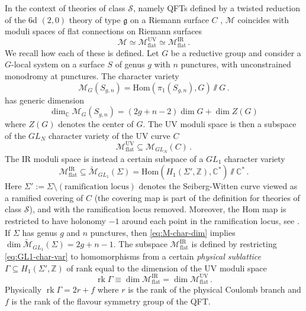 \documentclass{article}
\numberwithin{equation}{section}
\newcommand{\IC}{\mathbb{C}}
\newcommand{\IZ}{\mathbb{Z}}
\newcommand{\CS}{\mathcal{S}}
\renewcommand{\flat}{\mathrm{flat}}
\def\be{\begin{equation}}
\def\ee{\end{equation}}
\def\IZ{{\mathbb{Z}}}
\def\IC{{\mathbb{C}}}
\def\CM{{\mathcal{M}}}
\def\fg{\mathfrak{g}}
\def\fY{\Gamma}
\def\rk{\operatorname{rk}}
\begin{document}
In the context of theories of class $\CS$, namely QFTs defined by a twisted reduction of the 6d $(2,0)$ theory of type $\fg$ on a Riemann surface $C$ \cite{Gaiotto:2009we, Gaiotto:2009hg}, $\CM$ coincides with moduli spaces of flat connections on Riemann surfaces
\be\label{eq:UV-IR-isomorphism}
	\CM\simeq \CM^{\text{UV}}_{\flat} \simeq \CM^{\text{IR}}_{\flat}\,. 
\ee
We recall how each of these is defined. Let $G$ be a reductive group and consider a $G$-local system on a surface $S$ of genus $g$ with $n$ punctures, with unconstrained monodromy at punctures. 
The character variety 
\be\label{eq:char-var-def}
	\CM_{G}(S_{g,n}) = \mathrm{Hom}(\pi_1(S_{g,n}),G) \sslash G\,.
\ee  
has generic dimension
\be\label{eq:M-char-dim}
	\dim_{\IC}\CM_{G}(S_{g,n})= (2g+n-2) \dim G + \dim Z(G)
\ee
where $Z(G)$ denotes the center of $G$. 
The UV moduli space is then a subspace of the $GL_{N}$ character variety of the UV curve $C$
\be\label{eq:M-UV-inclusion}
	\CM^{\text{UV}}_{\flat} \subseteq\CM_{GL_N}(C)\,.
\ee
The IR moduli space is instead a certain subspace of a $GL_1$ character variety
\be\label{eq:GL1-char-var}
	\CM^{\text{IR}}_{\flat} \subseteq \tilde \CM_{GL_1}(\Sigma) 
	= \mathrm{Hom}(H_1(\Sigma',\IZ),\IC^*) \sslash \IC^*\,.
\ee
Here $\Sigma' := \Sigma\setminus (\text{ramification locus})$ denotes the Seiberg-Witten curve viewed as a ramified covering of $C$ (the covering map is part of the definition for theories of class $\CS$), and with the ramification locus removed. Moreover, the $\mathrm{Hom}$ map is restricted to have holonomy $-1$ around each point in the ramification locus, see \cite{Hollands:2013qza}.
If $\Sigma$ has genus $g$ and $n$ punctures, then \eqref{eq:M-char-dim} implies $\dim \tilde \CM_{GL_1}(\Sigma) =2g+n-1$.
The subspace $\CM^{\text{IR}}_{\flat}$ is defined by restricting \eqref{eq:GL1-char-var} to homomorphisms from a certain \textit{physical sublattice} $\fY \subseteq H_1(\Sigma',\IZ)$ of rank equal to the dimension of the UV moduli space
\be\label{eq:IR-moduli-dimension}
	\rk \fY \equiv \dim \CM^{\text{IR}}_{\flat}  =\dim \CM^{\text{UV}}_{\flat} \,.
\ee
Physically $\rk \fY = 2r+f$ where $r$ is the rank of the physical Coulomb branch and $f$ is the rank of the flavour symmetry group of the QFT.



\end{document}
